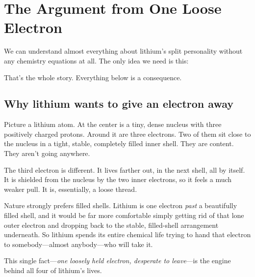 \documentclass[11pt, letterpaper]{article}
\begin{document}
\section{The Argument from One Loose Electron}

We can understand almost everything about lithium's split personality without any chemistry equations at all. The only idea we need is this:

\begin{center}
\end{center}

That's the whole story. Everything below is a consequence.

\subsection{Why lithium wants to give an electron away}

Picture a lithium atom. At the center is a tiny, dense nucleus with three positively charged protons. Around it are three electrons. Two of them sit close to the nucleus in a tight, stable, completely filled inner shell. They are content. They aren't going anywhere.

The third electron is different. It lives farther out, in the next shell, all by itself. It is shielded from the nucleus by the two inner electrons, so it feels a much weaker pull. It is, essentially, a loose thread.

Nature strongly prefers filled shells. Lithium is one electron \textit{past} a beautifully filled shell, and it would be far more comfortable simply getting rid of that lone outer electron and dropping back to the stable, filled-shell arrangement underneath. So lithium spends its entire chemical life trying to hand that electron to somebody---almost anybody---who will take it.

This single fact---\textit{one loosely held electron, desperate to leave}---is the engine behind all four of lithium's lives.

\end{document}
